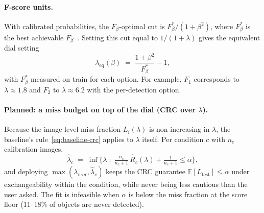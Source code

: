 \paragraph{F-score units.} With calibrated probabilities, the $F_\beta$-optimal cut is $F^*_\beta/(1+\beta^2)$,
where $F^*_\beta$ is the best achievable $F_\beta$~\citep{zhao2013beyond,lipton2014optimal}. Setting this cut
equal to $1/(1+\lambda)$ gives the equivalent dial setting
\begin{equation}
  \lambda_{\text{eq}}(\beta) \;=\; \frac{1+\beta^2}{F^*_\beta} - 1,
  \label{eq:fbeta}
\end{equation}
with $F^*_\beta$ measured on train for each option. For example, $F_1$ corresponds to $\lambda \approx 1.8$ and
$F_2$ to $\lambda \approx 6.2$ with the per-detection option.

\paragraph{Planned: a miss budget on top of the dial (CRC over $\lambda$).} Because the image-level miss fraction
$L_i(\lambda)$ is non-increasing in $\lambda$, the baseline's rule~\eqref{eq:baseline-crc} applies to $\lambda$
itself. Per condition $c$ with $n_c$ calibration images,
\begin{equation}
  \hat\lambda_c \;=\; \inf\Big\{\lambda \;:\; \tfrac{n_c}{n_c+1}\,\hat R_c(\lambda) + \tfrac{1}{n_c+1} \le \alpha\Big\},
  \label{eq:crc-lambda}
\end{equation}
and deploying $\max(\lambda_{\text{user}}, \hat\lambda_c)$ keeps the CRC guarantee
$\mathbb{E}[L_{\text{test}}] \le \alpha$ under exchangeability within the condition, while never being less
cautious than the user asked. The fit is infeasible when $\alpha$ is below the miss fraction at the score floor
(11--18\% of objects are never detected).

